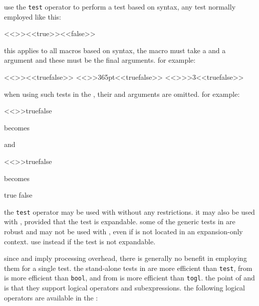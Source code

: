 \begin{marglist}
use the \texttt{test} operator to perform a test based on \latex syntax, \ie any test normally employed like this:

\begin{ltxcode}
<<\iftest>>{<<true>>}{<<false>>}
\end{ltxcode}
%
this applies to all macros based on \latex syntax, \ie the macro must take a  and a  argument and these must be the final arguments. for example:

\begin{ltxcode}
<<\ifdef>>{\somemacro}<<{true}{false}>>
<<\ifdimless>>{\textwidth}{365pt}<<{true}{false}>>
<<\ifnumcomp>>{\value{somecounter}}{>}{3}<<{true}{false}>>
\end{ltxcode}

when using such tests in the , their  and  arguments are omitted. for example:

\begin{ltxcode}
<<>>{true}{false}
\end{ltxcode}
%
becomes

\begin{ltxcode}
\end{ltxcode}
%
and

\begin{ltxcode}
<<>>{true}{false}
\end{ltxcode}
%
becomes

\begin{ltxcode}
{true}
{false}
\end{ltxcode}
%
the \texttt{test} operator may be used with  without any restrictions. it may also be used with , provided that the test is expandable. some of the generic tests in  are robust and may not be used with , even if  is not located in an expansion-only context. use  instead if the test is not expandable.

\end{marglist}

since  and  imply processing overhead, there is generally no benefit in employing them for a single test. the stand-alone tests in  are more efficient than \texttt{test},  from  is more efficient than \texttt{bool}, and  from  is more efficient than \texttt{togl}. the point of  and  is that they support logical operators and subexpressions. the following logical operators are available in the :

